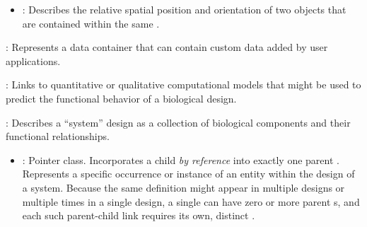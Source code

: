 \begin{description}
\begin{itemize}
\item \emph{}:
Describes the relative spatial position and orientation of two  objects that are contained within the same .
\end{itemize}

\item \emph{}:
Represents a data container that can contain custom data added by user applications.

\item \emph{}:
Links to quantitative or qualitative computational models that might be used to predict the functional behavior of a biological design.

\item \emph{}:
Describes a ``system'' design as a collection of biological components and their functional relationships.

\begin{itemize}
\item \emph{}:
Pointer class. Incorporates a child  \textit{by reference} into exactly one parent . Represents a specific occurrence or instance of an entity within the design of a system. Because the same definition might appear in multiple designs or multiple times in a single design, a single  can have zero or more parent s, and each such parent-child link requires its own, distinct .


\end{itemize}
\end{description}
